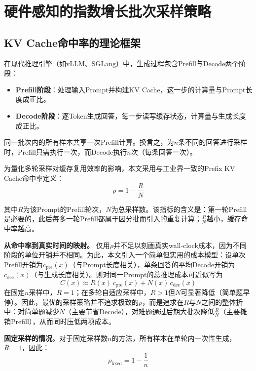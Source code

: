\section{硬件感知的指数增长批次采样策略}
\label{sec:exponential_batch_sampling}

\subsection{KV Cache命中率的理论框架}
\label{subsec:kv_cache_analysis}

在现代推理引擎（如vLLM、SGLang）中，生成过程包含Prefill与Decode两个阶段：
\begin{itemize}
    \item \textbf{Prefill阶段}：处理输入Prompt并构建KV Cache，这一步的计算量与Prompt长度成正比。
    \item \textbf{Decode阶段}：逐Token生成回答，每一步读写缓存状态，计算量与生成长度成正比。
\end{itemize}

同一批次内的所有样本共享一次Prefill计算。换言之，为$n$条不同的回答进行采样时，Prefill只需执行一次，而Decode执行$n$次（每条回答一次）。

为量化多轮采样对缓存复用效率的影响，本文采用与工业界一致的Prefix KV Cache命中率定义：
\begin{equation}
\rho = 1 - \frac{R}{N}
\label{eq:kv_cache_hit_rate}
\end{equation}

其中$R$为该Prompt的Prefill轮次，$N$为总采样数。该指标的含义是：第一轮Prefill是必要的，此后每多一轮Prefill都属于因分批而引入的重复计算；$\frac{R}{N}$越小，缓存命中率越高。

\textbf{从命中率到真实时间的映射。} 仅用$\rho$并不足以刻画真实wall-clock成本，因为不同阶段的单位开销并不相同。为此，本文引入一个简单但实用的成本模型：设单次Prefill开销为$c_\text{pre}(x)$（与Prompt长度相关），单条回答的平均Decode开销为$c_\text{dec}(x)$（与生成长度相关）。则对同一Prompt的总推理成本可近似写为
\begin{equation}
C(x) \approx R(x)\,c_\text{pre}(x) + N(x)\,c_\text{dec}(x)
\label{eq:cost_model}
\end{equation}
在固定$n$采样中，$R=1$；在多轮自适应采样中，$R>1$但$N$可显著降低（简单题早停）。因此，最优的采样策略并不追求极致的$\rho$，而是追求在$R$与$N$之间的整体折中：对简单题减少$N$（主要节省Decode），对难题通过后期大批次降低$\frac{R}{N}$（主要摊销Prefill），从而同时压低两项成本。

\textbf{固定采样的情况}。对于固定采样数$n$的方法，所有样本在单轮内一次性生成，$R = 1$，因此：
\begin{equation}
\rho_{\text{fixed}} = 1 - \frac{1}{n}
\label{eq:kv_cache_fixed}
\end{equation}

